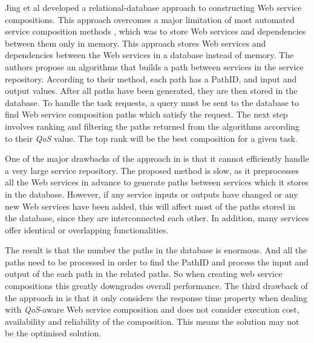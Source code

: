 Jing et al \cite{26} developed a relational-database approach to constructing Web service compositions. This approach overcomes a major limitation of most automated service composition methods \cite{2,5}, which was to store Web services and dependencies between them only in memory. This approach stores  Web services and dependencies between the Web services in a database instead of memory. The authors propose an algorithms that builds a path between services in the service repository. According to their method, each path has a PathID, and input and output values. After all paths have been generated, they are then stored in the database. To handle the task requests, a query must be sent to the database to find Web service composition paths which satisfy the request. The next step involves ranking and filtering the paths returned from the algorithms according to their \emph{QoS} value. The top rank will be the best composition for a given task. \par
One of the major drawbacks of the approach in \cite{26} is that it cannot efficiently handle a very large service repository. The proposed method is slow, as it preprocesses all the Web services in advance to generate paths between services which it stores in the database. However, if any service inputs or outputs have changed or any new Web services have been added, this will affect most of the paths stored in the database, since they are interconnected each other. In addition, many services offer identical or overlapping functionalities.\par
The result is that the number the paths in the database is enormous. And all the paths need to be processed in order to find the PathID and process the input and output of the each path in the related paths. So when creating web service compositions this greatly downgrades overall performance. The third drawback of the approach in \cite{26} is that it only considers the response time property when dealing with \emph{QoS}-aware Web service composition and does not consider execution cost, availability and reliability of the composition. This means the solution may not be the optimised solution.\par


